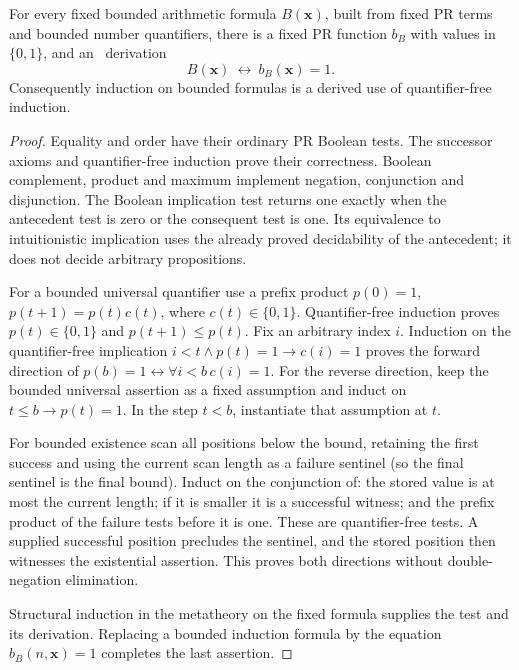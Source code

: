 \begin{lemma}
\label{lem:booleanization}
For every fixed bounded arithmetic formula \(B(\boldsymbol x)\), built
from fixed PR terms and bounded number quantifiers, there is a fixed PR
function \(b_B\) with values in \(\{0,1\}\), and an \ipra\ derivation
\[
 B(\boldsymbol x)\ \longleftrightarrow\ b_B(\boldsymbol x)=1.
\]
Consequently induction on bounded formulas is a derived use of
quantifier-free induction.
\end{lemma}
\begin{proof}
Equality and order have their ordinary PR Boolean tests. The successor
axioms and quantifier-free induction prove their correctness. Boolean
complement, product and maximum implement negation, conjunction and
disjunction. The Boolean implication test returns one exactly when the
antecedent test is zero or the consequent test is one. Its equivalence to
intuitionistic implication uses the already proved decidability of the
antecedent; it does not decide arbitrary propositions.

For a bounded universal quantifier use a prefix product
\(p(0)=1\), \(p(t+1)=p(t)c(t)\), where \(c(t)\in\{0,1\}\).
Quantifier-free induction proves \(p(t)\in\{0,1\}\) and
\(p(t+1)\le p(t)\). Fix an arbitrary index \(i\). Induction on the
quantifier-free implication
\(i<t\land p(t)=1\to c(i)=1\) proves the forward direction of
\(p(b)=1\leftrightarrow\forall i<b\,c(i)=1\).
For the reverse direction, keep the bounded universal assertion as a
fixed assumption and induct on \(t\le b\to p(t)=1\). In the step
\(t<b\), instantiate that assumption at \(t\).

For bounded existence scan all positions below the bound, retaining the
first success and using the current scan length as a failure sentinel
(so the final sentinel is the final bound). Induct
on the conjunction of: the stored value is at most the current length;
if it is smaller it is a successful witness; and the prefix product of
the failure tests before it is one. These are quantifier-free tests.
A supplied successful position precludes the sentinel, and the stored
position then witnesses the existential assertion. This proves both
directions without double-negation elimination.

Structural induction in the metatheory on the fixed formula supplies
the test and its derivation. Replacing a bounded induction formula by
the equation \(b_B(n,\boldsymbol x)=1\) completes the last assertion.
\end{proof}

